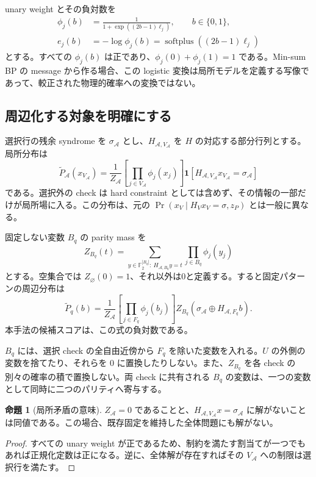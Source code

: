 \documentclass[a4paper,11pt]{ltjsarticle}
\numberwithin{equation}{section}
\theoremstyle{definition}
\newtheorem{proposition}[definition]{命題}
\newcommand{\Ftwo}{\mathbb F_2}
\newcommand{\A}{\mathcal A}
\newcommand{\I}{\mathbf 1}
\newcommand{\softplus}{\operatorname{softplus}}
\begin{document}
unary weight とその負対数を
\begin{align}
 \phi_j(b)&=\frac{1}{1+\exp((2b-1)\ell_j)},\qquad b\in\{0,1\},
 \label{eq:phi}\\
 e_j(b)&=-\log\phi_j(b)
       =\softplus((2b-1)\ell_j)
 \label{eq:unary-cost}
\end{align}
とする。すべての $\phi_j(b)$ は正であり、$\phi_j(0)+\phi_j(1)=1$ である。Min-sum BP の message から作る場合、この logistic 変換は局所モデルを定義する写像であって、較正された物理的確率への変換ではない。

\subsection{周辺化する対象を明確にする}
選択行の残余 syndrome を $\sigma_\A$ とし、$H_{\A,V_\A}$ を $H$ の対応する部分行列とする。局所分布は
\begin{equation}
 \widetilde P_\A(x_{V_\A})=
 \frac{1}{Z_\A}
 \left[\prod_{j\in V_\A}\phi_j(x_j)\right]
 \I[H_{\A,V_\A}x_{V_\A}=\sigma_\A]
 \label{eq:local-joint}
\end{equation}
である。選択外の check は hard constraint としては含めず、その情報の一部だけが局所場に入る。この分布は、元の $\Pr(x_V\mid H_Vx_V=\sigma,z_P)$ とは一般に異なる。

固定しない変数 $B_q$ の parity mass を
\begin{equation}
 Z_{B_q}(t)=
 \sum_{y\in\Ftwo^{|B_q|}:\ H_{\A,B_q}y=t}
       \prod_{j\in B_q}\phi_j(y_j)
 \label{eq:boundary-mass}
\end{equation}
とする。空集合では $Z_\varnothing(0)=1$、それ以外は0と定義する。すると固定パターンの周辺分布は
\begin{equation}
 \widetilde P_q(b)=\frac{1}{Z_\A}
       \left[\prod_{j\in F_q}\phi_j(b_j)\right]
       Z_{B_q}(\sigma_\A\oplus H_{\A,F_q}b).
 \label{eq:local-marginal}
\end{equation}
本手法の候補スコアは、この式の負対数である。

$B_q$ には、選択 check の全自由近傍から $F_q$ を除いた変数を入れる。$U$ の外側の変数を捨てたり、それらを $0$ に置換したりしない。また、$Z_{B_q}$ を各 check の別々の確率の積で置換しない。両 check に共有される $B_q$ の変数は、一つの変数として同時に二つのパリティへ寄与する。

\begin{proposition}[局所矛盾の意味]
$Z_\A=0$ であることと、$H_{\A,V_\A}x=\sigma_\A$ に解がないことは同値である。この場合、既存固定を維持した全体問題にも解がない。
\end{proposition}
\begin{proof}
すべての unary weight が正であるため、制約を満たす割当てが一つでもあれば正規化定数は正になる。逆に、全体解が存在すればその $V_\A$ への制限は選択行を満たす。
\end{proof}
\end{document}
